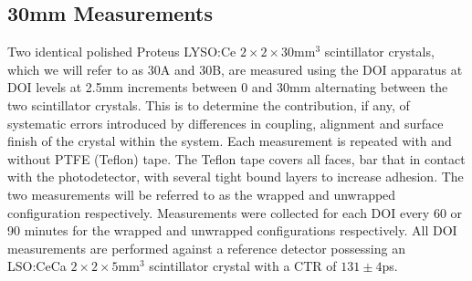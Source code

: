 \subsection{30mm Measurements}
Two identical polished Proteus LYSO:Ce $2\times2\times30$mm$^3$ scintillator crystals, which we will refer to as 30A and 30B, are measured using the DOI apparatus at DOI levels at 2.5mm increments between 0 and 30mm alternating between the two scintillator crystals. This is to determine the contribution, if any, of systematic errors introduced by differences in coupling, alignment and surface finish of the crystal within the system. Each measurement is repeated with and without PTFE (Teflon) tape. The Teflon tape covers all faces, bar that in contact with the photodetector, with several tight bound layers to increase adhesion. The two measurements will be referred to as the wrapped and unwrapped configuration respectively. Measurements were collected for each DOI every 60 or 90 minutes for the wrapped and unwrapped configurations respectively. All DOI measurements are performed against a reference detector possessing an LSO:CeCa $2\times2\times5$mm$^3$ scintillator crystal with a CTR of $131\pm4$ps.

